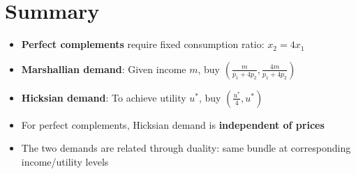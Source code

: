\documentclass[11pt]{article}
\begin{document}
\section{Summary}

\begin{itemize}
    \item \textbf{Perfect complements} require fixed consumption ratio: $x_2 = 4x_1$

    \item \textbf{Marshallian demand}: Given income $m$, buy $\left(\frac{m}{p_1 + 4p_2}, \frac{4m}{p_1 + 4p_2}\right)$

    \item \textbf{Hicksian demand}: To achieve utility $u^*$, buy $\left(\frac{u^*}{4}, u^*\right)$

    \item For perfect complements, Hicksian demand is \textbf{independent of prices}

    \item The two demands are related through duality: same bundle at corresponding income/utility levels
\end{itemize}
\end{document}
